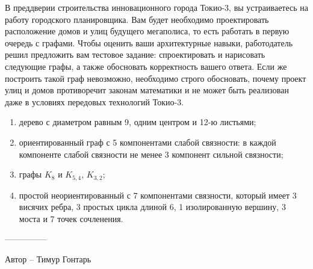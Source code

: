 \question
В преддверии строительства инновационного города Токио-3, вы устраиваетесь на работу городского планировщика. Вам будет необходимо проектировать расположение домов и улиц будущего мегаполиса, то есть работать в первую очередь с графами. Чтобы оценить ваши архитектурные навыки, работодатель решил предложить вам тестовое задание: спроектировать и нарисовать следующие графы, а также обосновать корректность вашего ответа. Если же построить такой граф невозможно, необходимо строго обосновать, почему проект улиц и домов противоречит законам математики и не может быть реализован даже в условиях передовых технологий Токио-3.

\begin{enumerate}
\item  дерево с диаметром равным 9, одним центром и 12-ю листьями;
\item  ориентированный граф с 5 компонентами слабой связности: в  каждой компоненте слабой связности не менее 3 компонент сильной связности;
\item  графы $K_8$ и $K_{5,4}$, $K_{3,2}$;
\item  простой неориентированный с 7 компонентами связности, который имеет 3 висячих ребра, 3 простых цикла длиной 6, 1 изолированную вершину, 3 моста и 7 точек сочленения.
\end{enumerate}

---------------

Автор -- Тимур Гонтарь
